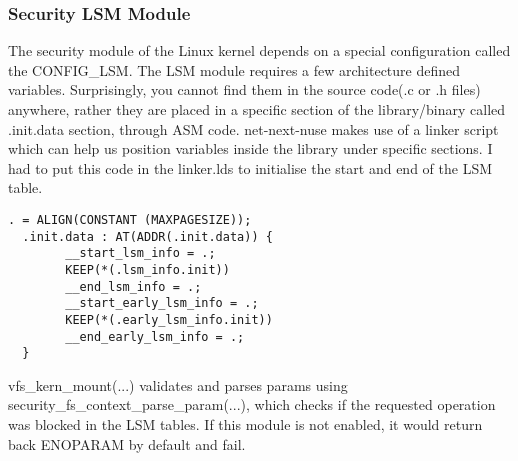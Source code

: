 \documentclass{sig-alternate}
\begin{document}
\subsubsection{Security LSM Module}
The security module of the Linux kernel depends on a special configuration called the CONFIG\_LSM. The LSM module requires a few architecture 
defined variables. Surprisingly, you cannot find them in the source code(.c or .h files) anywhere, rather they are placed in a specific section 
of the library/binary called .init.data section, through ASM code. net-next-nuse makes use of a linker script which can help us position variables inside 
the library under specific sections. I had to put this code in the linker.lds to initialise the start and end of the LSM table. 
\begin{lstlisting}[style=CStyle] 
  . = ALIGN(CONSTANT (MAXPAGESIZE));
  .init.data : AT(ADDR(.init.data)) {    
		__start_lsm_info = .;	
		KEEP(*(.lsm_info.init))
		__end_lsm_info = .;    
		__start_early_lsm_info = .;	
		KEEP(*(.early_lsm_info.init))
		__end_early_lsm_info = .;
  }
\end{lstlisting}
vfs\_kern\_mount(...) validates and parses params using security\_fs\_context\_parse\_param(...), which checks if the requested operation was blocked 
in the LSM tables. If this module is not enabled, it would return back ENOPARAM by default and fail. 
\end{document}
